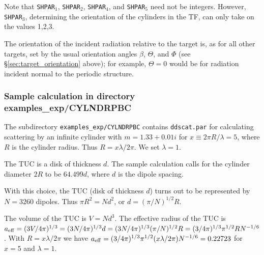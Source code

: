 	Note that {\tt SHPAR}$_1$, {\tt SHPAR}$_2$, {\tt SHPAR}$_4$, and 
        {\tt SHPAR}$_5$ need not be integers.  
        However, {\tt SHPAR}$_3$, determining the orientation of the cylinders 
        in the TF, can only take on the values 1,2,3.

	The orientation of the incident radiation relative to the target
	is, as for all other targets, set by the usual orientation
	angles $\beta$, $\Theta$, and $\Phi$ 
	(see \S\ref{sec:target_orientation} above); for example,
	$\Theta=0$ would be for radiation incident normal to the periodic
	structure.



\subsubsection{\bf Sample calculation in directory examples\_exp/CYLNDRPBC}

The subdirectory {\tt examples\_exp/CYLNDRPBC} contains {\tt ddscat.par}
for calculating scattering by an infinite cylinder with $m=1.33+0.01i$ for 
$x\equiv 2\pi R/\lambda=5$, where $R$ is the cylinder radius.
Thus $R=x\lambda/2\pi$.
We set $\lambda=1$.

The TUC is a disk of thickness $d$. 
The sample calculation calls for the cylinder diameter $2R$ to be $64.499d$,
where $d$ is the dipole spacing.

With this choice, the TUC (disk of thickness $d$)
turns out to be represented by $N=3260$ dipoles.
Thus $\pi R^2 = N d^2$, or $d=(\pi/N)^{1/2} R$.

The volume of the TUC is $V=Nd^3$.
The effective radius of the TUC is 
${a}_{\rm eff}=(3V/4\pi)^{1/3} =
(3N/4\pi)^{1/3} d = 
(3N/4\pi)^{1/3} (\pi/N)^{1/2} R = 
(3/4\pi)^{1/3} \pi^{1/2} R N^{-1/6}$.
With $R=x\lambda/2\pi$ we have
${a}_{\rm eff}=(3/4\pi)^{1/3} \pi^{1/2} (x\lambda/2\pi) N^{-1/6} = 0.22723$
for $x=5$ and $\lambda=1$.

